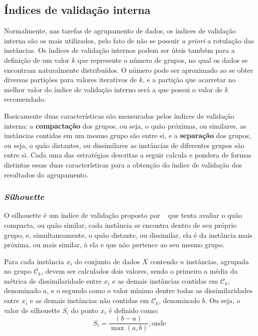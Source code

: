 \subsection{Índices de validação interna} \label{sec:indice_validacao_interna}

Normalmente, nas tarefas de agrupamento de dados, os índices de validação interna são os mais utilizados, pelo fato de não se possuir \emph{a priori} a rotulação das instâncias. Os índices de validação internos podem ser úteis também para a definição de um valor $k$ que represente o número de grupos, no qual os dados se encontram naturalmente distribuídos. O número pode ser aproximado ao se obter diversas partições para valores iterativos de $k$, e a partição que acarretar no melhor valor do índice de validação interno será a que possui o valor de $k$ recomendado.

Basicamente duas características são mensuradas pelos índices de validação interna: a \textbf{compactação} dos grupos, ou seja, o quão próximas, ou similares, as instâncias contidas em um mesmo grupo são entre si, e a \textbf{separação} dos grupos, ou seja, o quão distantes, ou dissimilares as instâncias de diferentes grupos são entre si. Cada uma das estratégias descritas a seguir calcula e pondera de formas distintas essas duas características para a obtenção do índice de validação dos resultados do agrupamento.

\subsubsection{\emph{Silhouette}}

O silhouette é um índice de validação proposto por ~\parencite{Rousseeuw:1987:SGA:38768.38772} que tenta avaliar o quão compacta, ou quão similar, cada instância se encontra dentro de seu próprio grupo, e, simultaneamente, o quão distante, ou dissimilar, ela é da instância mais próxima, ou mais similar, à ela e que não pertence ao seu mesmo grupo.

Para cada instância $x_i$ do conjunto de dados $X$ contendo $n$ instâncias, agrupada no grupo $\mathcal{C}_k$, devem ser calculados dois valores, sendo o primeiro a média da métrica de dissimilaridade entre $x_i$ e as demais instâncias contidas em $\mathcal{C}_k$, denominado $a$, e o segundo como o valor mínimo dentre todas as dissimilaridades entre $x_i$ e as demais instâncias não contidas em $\mathcal{C}_k$, denominado $b$. Ou seja, o valor de silhouette $S_i$ do ponto $x_i$ é definido como:
\begin{equation}
S_i = \frac{(b-a)}{\max(a,b)}, \mathrm{onde}
\end{equation}

